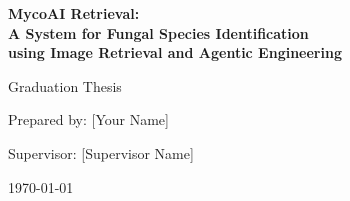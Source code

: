 \begin{titlepage}
    \centering
    \vspace*{1cm}
    
    {\Huge \textbf{MycoAI Retrieval: \\ A System for Fungal Species Identification \\ using Image Retrieval and Agentic Engineering} \par}
    \vspace{2cm}
    
    {\Large Graduation Thesis \par}
    \vspace{1cm}
    
    {\large Prepared by: [Your Name] \par}
    \vspace{0.5cm}
    {\large Supervisor: [Supervisor Name] \par}
    \vspace{2cm}
    
    \vfill
    {\large \today \par}
\end{titlepage}
